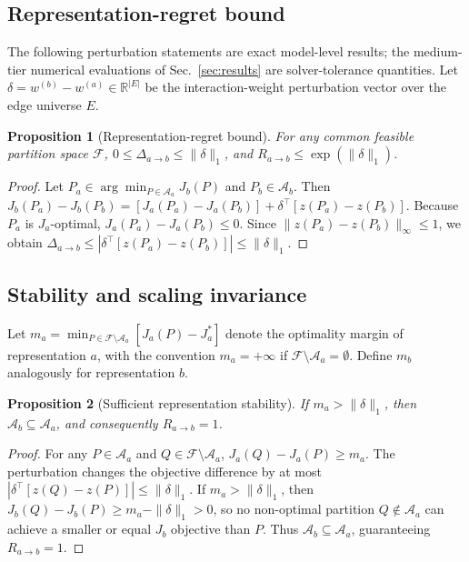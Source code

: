 \documentclass[
  aps,
  pra,
  reprint,
  amsmath,
  amssymb,
  longbibliography,
  nofootinbib,
  floatfix
]{revtex4-2}
\theoremstyle{plain}
\newtheorem{proposition}{Proposition}
\begin{document}
\subsection{Representation-regret bound}

The following perturbation statements are exact model-level results; the medium-tier numerical evaluations of Sec.~\ref{sec:results} are solver-tolerance quantities. Let $\delta=w^{(b)}-w^{(a)}\in\mathbb{R}^{|E|}$ be the interaction-weight perturbation vector over the edge universe $E$.

\begin{proposition}[Representation-regret bound]\label{prop:regret-bound}
For any common feasible partition space $\mathcal{F}$, $0\le\Delta_{a\to b}\le\|\delta\|_1$, and $R_{a\to b}\le\exp(\|\delta\|_1)$.
\end{proposition}
\begin{proof}
Let $P_a\in\arg\min_{P\in\mathcal{A}_a}J_b(P)$ and $P_b\in\mathcal{A}_b$. Then $J_b(P_a)-J_b(P_b)=[J_a(P_a)-J_a(P_b)]+\delta^\top[z(P_a)-z(P_b)]$. Because $P_a$ is $J_a$-optimal, $J_a(P_a)-J_a(P_b)\le0$. Since $\|z(P_a)-z(P_b)\|_\infty\le1$, we obtain $\Delta_{a\to b}\le|\delta^\top[z(P_a)-z(P_b)]|\le\|\delta\|_1$.
\end{proof}

\subsection{Stability and scaling invariance}

Let $m_a=\min_{P\in\mathcal{F}\setminus\mathcal{A}_a}[J_a(P)-J_a^*]$ denote the optimality margin of representation $a$, with the convention $m_a=+\infty$ if $\mathcal{F}\setminus\mathcal{A}_a=\emptyset$. Define $m_b$ analogously for representation $b$.

\begin{proposition}[Sufficient representation stability]\label{prop:stability}
If $m_a>\|\delta\|_1$, then $\mathcal{A}_b\subseteq\mathcal{A}_a$, and consequently $R_{a\to b}=1$.
\end{proposition}
\begin{proof}
For any $P\in\mathcal{A}_a$ and $Q\in\mathcal{F}\setminus\mathcal{A}_a$, $J_a(Q)-J_a(P)\ge m_a$. The perturbation changes the objective difference by at most $|\delta^\top[z(Q)-z(P)]|\le\|\delta\|_1$. If $m_a>\|\delta\|_1$, then $J_b(Q)-J_b(P)\ge m_a-\|\delta\|_1>0$, so no non-optimal partition $Q\notin\mathcal{A}_a$ can achieve a smaller or equal $J_b$ objective than $P$. Thus $\mathcal{A}_b\subseteq\mathcal{A}_a$, guaranteeing $R_{a\to b}=1$.
\end{proof}
\end{document}
